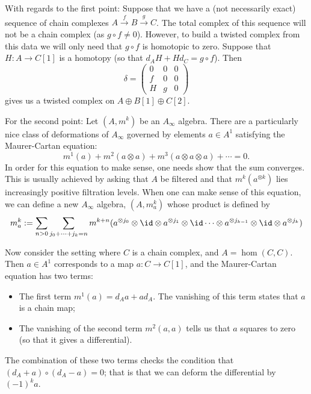 



    With regards to the first point: Suppose that we have a (not necessarily exact) sequence of chain complexes $A\xrightarrow{f} B \xrightarrow{g} C$. The total complex of this sequence will not be a chain complex (as $g\circ f \neq 0$). However, to build a twisted complex from this data we will only need that $g\circ f$ is homotopic to zero. Suppose that  $H:A\to C[1]$ is a homotopy (so that $d_AH+Hd_C=g\circ f$). Then  
    \[\delta = \begin{pmatrix}
        0 & 0 & 0\\
        f & 0 & 0\\
        H & g & 0
    \end{pmatrix}\]
    gives us a twisted complex on $A\oplus B[1]\oplus C[2]$.

    For the second point: Let $(A, m^k)$ be an $A_\infty$ algebra. There are a particularly nice class of deformations of $A_\infty$ governed by elements $a\in A^1$ satisfying the Maurer-Cartan equation:
    \[m^1(a)+m^2(a\otimes a)+m^3(a\otimes a \otimes a)+\cdots =0.\]
    In order for this equation to make sense, one needs show that the sum converges. This is usually achieved by asking that $A$ be filtered and that $m^k(a^{\otimes k})$ lies increasingly positive filtration levels.
    When one can make sense of this equation, we can define a new $A_\infty$ algebra, $(A, m^k_a)$ whose product is defined by 
    \[m^k_a:=\sum_{n>0}\sum_{j_0+\cdots+j_k=n} m^{k+n}(a^{\otimes j_0}\otimes \id \otimes a^{\otimes j_1}\otimes \id \cdots \otimes a^{\otimes j_{k-1}}\otimes \id \otimes a^{\otimes j_k})\]

    Now consider the setting where $C$ is a chain complex, and $A=\hom(C, C)$. Then $a\in A^1$ corresponds to a map $a: C\to C[1]$, and the Maurer-Cartan equation has two terms:
    \begin{itemize}
        \item The first term $m^1(a) = d_A a + a d_A$. The vanishing of this term states that $a$ is a chain map;
        \item The vanishing of the second term $m^2(a, a)$ tells us that $a$ squares to zero (so that it gives a differential).
    \end{itemize}
    The combination of these two terms checks the condition that $(d_A+a)\circ (d_A -a)=0$; that is that we can deform the differential by $(-1)^k a$.
 